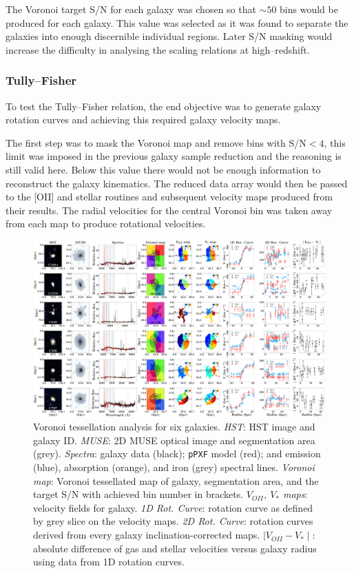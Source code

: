 \documentclass[12pt, twocolumn, nofootinbib]{revtex4-1}    %
\begin{document}
The Voronoi target S/N for each galaxy was chosen so that $\sim50$ bins would be produced for each galaxy. This value was selected as it was found to separate the galaxies into enough discernible individual regions. Later S/N masking would increase the difficulty in analysing the scaling relations at high--redshift.

\vspace{2ex} %
\subsubsection{Tully--Fisher} \label{sec:voronoi_tully_fisher}
\noindent
To test the Tully--Fisher relation, the end objective was to generate galaxy rotation curves and achieving this required galaxy velocity maps. 

The first step was to mask the Voronoi map and remove bins with S/N$<4$, this limit was imposed in the previous galaxy sample reduction and the reasoning is still valid here. Below this value there would not be enough information to reconstruct the galaxy kinematics. The reduced data array would then be passed to the [OII] and stellar routines and subsequent velocity maps produced from their results. The radial velocities for the central Voronoi bin was taken away from each map to produce rotational velocities. 

\begin{figure}
\vspace{50ex}
\includegraphics[width=1.0\textheight,height=0.6\textwidth]{data/spectra_complete_velocities}
\caption[Tully-Fisher]{Voronoi tessellation analysis for six galaxies. \textit{HST}: HST image and galaxy ID. \textit{MUSE}: 2D MUSE optical image and segmentation area (grey). \textit{Spectra}: galaxy data (black); \texttt{pPXF} model (red); and emission (blue), absorption (orange), and iron (grey) spectral lines. \textit{Voronoi map}: Voronoi tessellated map of galaxy, segmentation area, and the target S/N with achieved bin number in brackets. \textit{$V_{OII}$, $V_{*}$ maps}: velocity fields for galaxy. \textit{1D Rot. Curve}: rotation curve as defined by grey slice on the velocity maps. \textit{2D Rot. Curve}: rotation curves derived from every galaxy inclination-corrected maps. \textit{$\mid V_{OII}-V_* \mid$}: absolute difference of gas and stellar velocities versus galaxy radius using data from 1D rotation curves.}
\label{fig:multiple_spectra_tully_fisher}
\end{figure}
\end{document}
